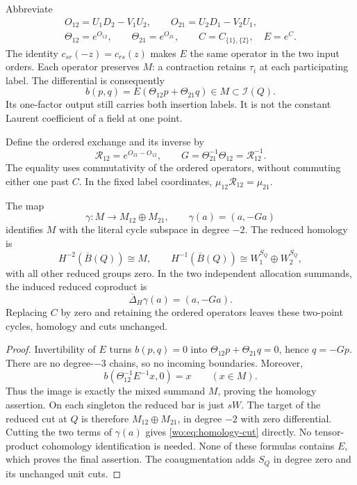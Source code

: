 Abbreviate
\[
 \begin{gathered}
 O_{12}=U_1D_2-V_1U_2,\qquad O_{21}=U_2D_1-V_2U_1,\\
 \Theta_{12}=e^{O_{12}},\qquad \Theta_{21}=e^{O_{21}},
 \qquad C=C_{\{1\},\{2\}},\quad E=e^C.
 \end{gathered}
\]
The identity \(c_{sr}(-z)=c_{rs}(z)\) makes \(E\) the same
operator in the two input orders.  Each operator preserves \(M\):
a contraction retains \(\tau_i\) at each participating label.
The differential is consequently
\begin{equation}\label{wo:eq:row}
 b(p,q)=E(\Theta_{12}p+\Theta_{21}q)
          \in M\subset\mathcal I(Q).
\end{equation}
Its one-factor output still carries both insertion labels.  It is
not the constant Laurent coefficient of a field at one point.

Define the ordered exchange and its inverse by
\begin{equation}\label{wo:eq:exchange}
 \mathcal R_{12}=e^{O_{21}-O_{12}},\qquad
 G=\Theta_{21}^{-1}\Theta_{12}=\mathcal R_{12}^{-1}.
\end{equation}
The equality uses commutativity of the ordered operators, without
commuting either one past \(C\).  In the fixed label coordinates,
\(\mu_{12}\mathcal R_{12}=\mu_{21}\).

\begin{theorem}\label{wo:thm:homology}
The map
\begin{equation}\label{wo:eq:graph}
 \gamma:M\longrightarrow M_{12}\oplus M_{21},\qquad
 \gamma(a)=(a,-Ga)
\end{equation}
identifies \(M\) with the literal cycle subspace in degree \(-2\).
The reduced homology is
\[
 H^{-2}(\overline B(Q))\cong M,\qquad
 H^{-1}(\overline B(Q))\cong W_1^{S_Q}\oplus W_2^{S_Q},
\]
with all other reduced groups zero.  In the two independent
allocation summands, the induced reduced coproduct is
\begin{equation}\label{wo:eq:homology-cut}
 \overline\Delta_H\gamma(a)=(a,-Ga).
\end{equation}
Replacing \(C\) by zero and retaining the ordered operators leaves
these two-point cycles, homology and cuts unchanged.
\end{theorem}
\begin{proof}
Invertibility of \(E\) turns \(b(p,q)=0\) into
\(\Theta_{12}p+\Theta_{21}q=0\), hence \(q=-Gp\).
There are no degree-\(-3\) chains, so no incoming boundaries.
Moreover,
\[
 b(\Theta_{12}^{-1}E^{-1}x,0)=x\qquad(x\in M).
\]
Thus the image is exactly the mixed summand \(M\), proving the
homology assertion.  On each singleton the reduced bar is just
\(sW\).  The target of the reduced cut at \(Q\) is therefore
\(M_{12}\oplus M_{21}\), in degree \(-2\) with zero differential.
Cutting the two terms of \(\gamma(a)\) gives
\eqref{wo:eq:homology-cut} directly.  No tensor-product cohomology
identification is needed.  None of these formulas contains \(E\),
which proves the final assertion.  The coaugmentation adds
\(S_Q\) in degree zero and its unchanged unit cuts.
\end{proof}

